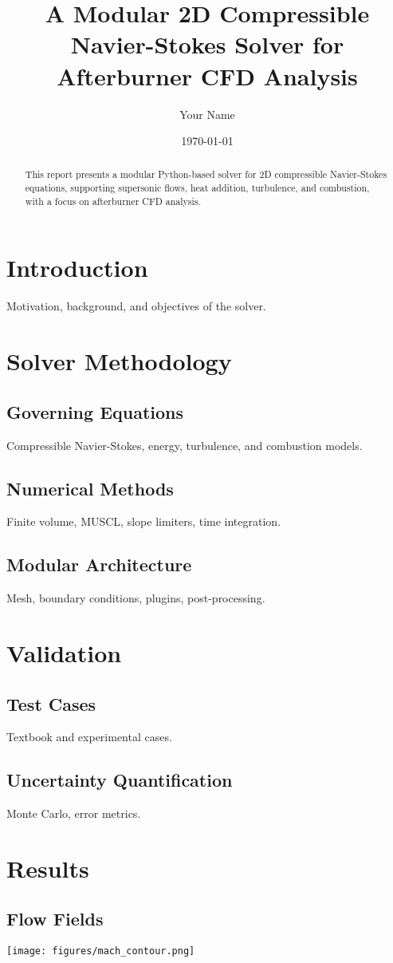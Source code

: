 \documentclass{article}
\title{A Modular 2D Compressible Navier-Stokes Solver for Afterburner CFD Analysis}
\author{Your Name}
\date{\today}
\begin{document}
\maketitle
\begin{abstract}
This report presents a modular Python-based solver for 2D compressible Navier-Stokes equations, supporting supersonic flows, heat addition, turbulence, and combustion, with a focus on afterburner CFD analysis.
\end{abstract}
\section{Introduction}
Motivation, background, and objectives of the solver.
\section{Solver Methodology}
\subsection{Governing Equations}
Compressible Navier-Stokes, energy, turbulence, and combustion models.
\subsection{Numerical Methods}
Finite volume, MUSCL, slope limiters, time integration.
\subsection{Modular Architecture}
Mesh, boundary conditions, plugins, post-processing.
\section{Validation}
\subsection{Test Cases}
Textbook and experimental cases.
\subsection{Uncertainty Quantification}
Monte Carlo, error metrics.
\section{Results}
\subsection{Flow Fields}
\texttt{[image: figures/mach\_contour.png]}
\end{document}
